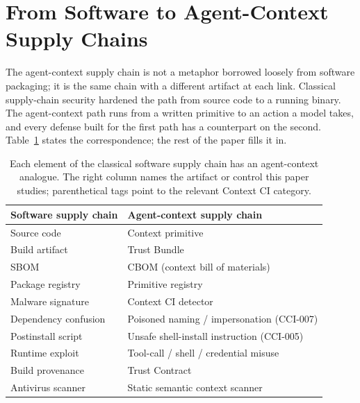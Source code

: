 
\section{From Software to Agent-Context Supply Chains}
\label{sec:bridge}

The agent-context supply chain is not a metaphor borrowed loosely from
software packaging; it is the same chain with a different artifact at
each link. Classical supply-chain security hardened the path from source
code to a running binary. The agent-context path runs from a written
primitive to an action a model takes, and every defense built for the
first path has a counterpart on the second.
Table~\ref{tab:bridge} states the correspondence; the rest of the paper
fills it in.

\begin{table}[t]
\centering
\caption{Each element of the classical software supply chain has an
agent-context analogue. The right column names the artifact or control
this paper studies; parenthetical tags point to the relevant Context CI
category.}
\label{tab:bridge}
\small
\begin{tabular}{@{}p{} p{}@{}}
\toprule
\textbf{Software supply chain} & \textbf{Agent-context supply chain} \\
\midrule
Source code            & Context primitive \\
Build artifact         & Trust Bundle \\
SBOM                   & CBOM (context bill of materials) \\
Package registry       & Primitive registry \\
Malware signature      & Context CI detector \\
Dependency confusion   & Poisoned naming / impersonation (CCI-007) \\
Postinstall script     & Unsafe shell-install instruction (CCI-005) \\
Runtime exploit        & Tool-call / shell / credential misuse \\
Build provenance       & Trust Contract \\
Antivirus scanner      & Static semantic context scanner \\
\bottomrule
\end{tabular}
\end{table}

